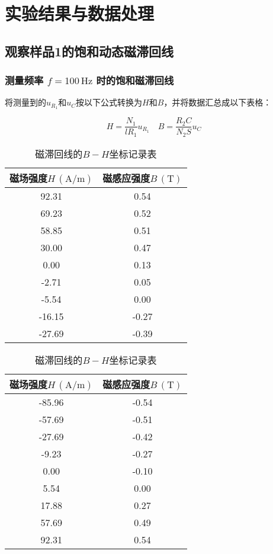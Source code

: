 \documentclass[12pt]{article}
\begin{document}
\section{实验结果与数据处理}

\subsection{观察样品1的饱和动态磁滞回线}

\subsubsection{测量频率 $f=100\,\mathrm{Hz}$ 时的饱和磁滞回线}

将测量到的$u_{R_1}$和$u_C$按以下公式转换为$H$和$B$，并将数据汇总成以下表格：

\[
    H=\frac{N_1}{lR_1}u_{R_{1}} \quad B=\frac{R_2C}{N_2S}u_C
\]

\begin{table}[htbp]
    \centering
      \begin{tabular}{|c|c|}
      \hline
      磁场强度$H\,(\mathrm{A/m})$     & 磁感应强度$B\,(\mathrm{T})$ \\
      \hline
      92.31  & 0.54  \\
      \hline
      69.23  & 0.52  \\
      \hline
      58.85  & 0.51  \\
      \hline
      30.00  & 0.47  \\
      \hline
      0.00  & 0.13  \\
      \hline
      -2.71  & 0.05  \\
      \hline
      -5.54  & 0.00  \\
      \hline
      -16.15  & -0.27  \\
      \hline
      -27.69  & -0.39  \\
      
      \hline
      \end{tabular}%
      \quad
      \begin{tabular}{|c|c|}
      \hline
      磁场强度$H\,(\mathrm{A/m})$     & 磁感应强度$B\,(\mathrm{T})$ \\
      \hline
      -85.96  & -0.54  \\
      \hline
      -57.69  & -0.51  \\
      \hline
      -27.69  & -0.42  \\
      \hline
      -9.23  & -0.27  \\
      \hline
      0.00  & -0.10  \\
      \hline
      5.54  & 0.00  \\
      \hline
      17.88  & 0.27  \\
      \hline
      57.69  & 0.49  \\
      \hline
      92.31  & 0.54  \\
      \hline
      \end{tabular}%
    \caption{磁滞回线的$B-H$坐标记录表}
  \end{table}%
\end{document}
